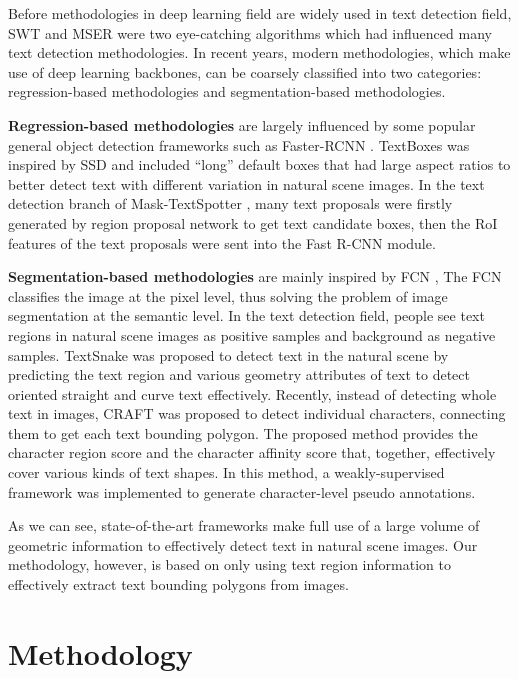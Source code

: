 \documentclass[10pt,twocolumn,letterpaper]{article}
\begin{document}
Before methodologies in deep learning field are widely used in text detection field, SWT \cite{swt} and MSER \cite{mser} were two eye-catching algorithms which had influenced many text detection methodologies. In recent years, modern methodologies, which make use of deep learning backbones, can be coarsely classified into two categories: regression-based methodologies and segmentation-based methodologies.

{\bf Regression-based methodologies} are largely influenced by some popular general object detection frameworks such as Faster-RCNN \cite{faster-rcnn}. TextBoxes \cite{textboxes} was inspired by SSD \cite{ssd} and included “long” default boxes that had large aspect ratios to better detect text with different variation in natural scene images. In the text detection branch of Mask-TextSpotter \cite{mask_textspotter}, many text proposals were firstly generated by region proposal network to get text candidate boxes, then the RoI features of the text proposals were sent into the Fast R-CNN module.

{\bf Segmentation-based methodologies} are mainly inspired by FCN \cite{fcn}, The FCN classifies the image at the pixel level, thus solving the problem of image segmentation at the semantic level. In the text detection field, people see text regions in natural scene images as positive samples and background as negative samples. TextSnake \cite{textsnake} was proposed to detect text in the natural scene by predicting the text region and various geometry attributes of text to detect oriented straight and curve text effectively. Recently, instead of detecting whole text in images, CRAFT \cite{craft} was proposed to detect individual characters, connecting them to get each text bounding polygon. The proposed method provides the character region score and the character affinity score that, together, effectively cover various kinds of text shapes. In this method, a weakly-supervised framework was implemented to generate character-level pseudo annotations.

As we can see, state-of-the-art frameworks make full use of a large volume of geometric information to effectively detect text in natural scene images. Our methodology, however, is based on only using text region information to effectively extract text bounding polygons from images.

\section{Methodology}
\end{document}
